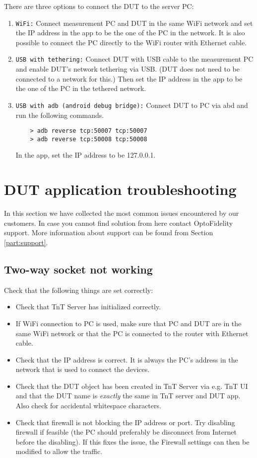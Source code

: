 There are three options to connect the DUT to the server PC:
\begin{enumerate}
	\item \texttt{WiFi:} Connect measurement PC and DUT in the same WiFi network and set the IP address in the app to be the one of the PC in the network. It is also possible to connect the PC directly to the WiFi router with Ethernet cable.
	\item \texttt{USB with tethering:} Connect DUT with USB cable to the measurement PC and enable DUT's network tethering via USB. (DUT does not need to be connected to a network for this.) Then set the IP address in the app to be the one of the PC in the tethered network.  
	\item \texttt{USB with adb (android debug bridge):} Connect DUT to PC via abd and run the following commands.
	\begin{lstlisting}
	> adb reverse tcp:50007 tcp:50007
	> adb reverse tcp:50008 tcp:50008
	\end{lstlisting}
	In the app, set the IP address to be 127.0.0.1.
\end{enumerate}


\section{DUT application troubleshooting}
In this section we have collected the most common issues encountered by our customers. In case you cannot find solution from here contact OptoFidelity support. More information about support can be found from Section \ref{part:support}.

\subsection{Two-way socket not working}
Check that the following things are set correctly:
\begin{itemize}
	\item Check that TnT Server has initialized correctly.
	\item If WiFi connection to PC is used, make sure that PC and DUT are in the same WiFi network or that the PC is connected to the router with Ethernet cable.
	\item Check that the IP address is correct. It is always the PC's address in the network that is used to connect the devices.
	\item Check that the DUT object has been created in TnT Server via e.g. TnT UI and that the DUT name is \emph{exactly} the same in TnT server and DUT app. Also check for accidental whitespace characters.
	\item Check that firewall is not blocking the IP address or port. Try disabling firewall if feasible (the PC should preferably be disconnect from Internet before the disabling). If this fixes the issue, the Firewall settings can then be modified to allow the traffic.
\end{itemize}

